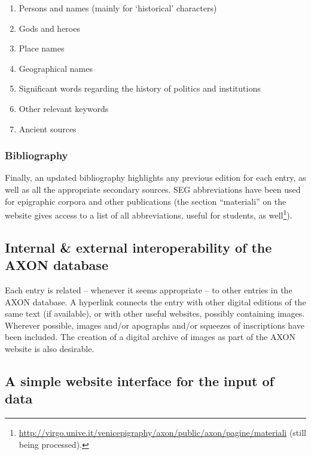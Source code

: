 \documentclass[amsthm,ebook]{saparticle}
\begin{document}
\begin{enumerate}
\item Persons and names (mainly for ‘historical’ characters)
\item Gods and heroes
\item Place names
\item Geographical names
\item Significant words regarding the history of politics and institutions
\item Other relevant keywords
\item Ancient sources
\end{enumerate}



\subsubsection{Bibliography}


\noindent Finally, an updated bibliography highlights any previous edition for each entry, as well as all the appropriate
secondary sources. SEG abbreviations have been used for epigraphic corpora and other publications (the section
``materiali'' on the website gives access to a list of all abbreviations, useful for students, as well\footnote{
\url{http://virgo.unive.it/venicepigraphy/axon/public/axon/pagine/materiali} (still being processed).}).




\subsection{Internal \& external interoperability of the AXON database}





\noindent Each entry is related – whenever it seems appropriate – to other entries in the AXON database. A hyperlink connects the
entry with other digital editions of the same text (if available), or with other useful websites, possibly containing
images. Wherever possible, images and/or apographs and/or squeezes of inscriptions have been included. The creation of
a digital archive of images as part of the AXON website is also desirable.




\subsection{A simple website interface for the input of data}
\end{document}
